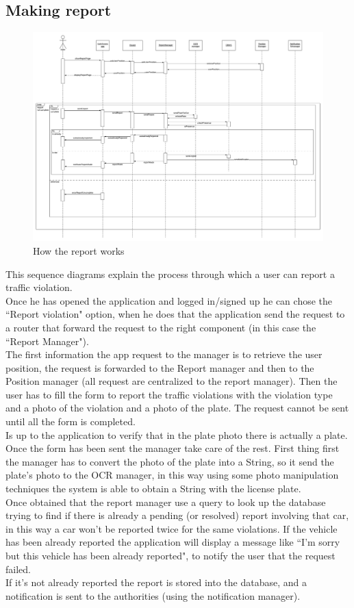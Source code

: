 \documentclass[12pt,a4paper]{report}
\begin{document}
			\subsection{Making report}
				\begin{figure}[H]
						\includegraphics[width = 1.5\textwidth, center]{Report}
						\caption{How the report works}
						\label{fig: diagrams}
				\end{figure}
				This sequence diagrams explain the process through which a user can report a traffic violation.\\
				Once he has opened the application and logged in/signed up he can chose the ``Report violation" option,
				when he does that the application send the request to a router that forward the request to the right
				component (in this case the ``Report Manager").\\
				The first information the app request to the manager is to retrieve the user position, the request is forwarded
				to the Report manager and then to the Position manager (all request are centralized to the report manager).
				Then the user has to fill the form to report the traffic violations with the violation type and a photo of the
				violation and a photo of the plate. The request cannot be sent until all the form is completed.\\
				Is up to the application to verify that in the plate photo there is actually a plate. %
				Once the form has been sent the manager take care of the rest. First thing first the manager has to convert
				the photo of the plate into a String, so it send the plate's photo to the OCR manager, in this way using some
				photo manipulation techniques the system is able to obtain a String with the license plate.\\
				Once obtained that the report manager use a query to look up the database trying to find if there is already a
				pending (or resolved) report involving that car, in this way a car won't be reported twice for the same
				violations. If the vehicle has been already reported the application will display a message like ``I'm sorry but
				this vehicle has been already reported", to notify the user that the request failed.\\
				If it's not already reported the report is stored into the database, and a notification is sent to the authorities
				(using the notification manager).
\end{document}
